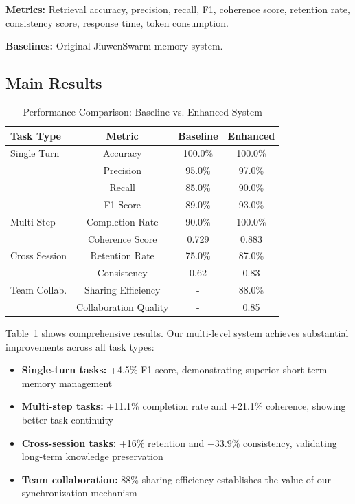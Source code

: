 \documentclass{article}
\begin{document}
\textbf{Metrics:} Retrieval accuracy, precision, recall, F1, coherence score,
retention rate, consistency score, response time, token consumption.

\textbf{Baselines:} Original JiuwenSwarm memory system.

\subsection{Main Results}

\begin{table}[h]
\centering
\caption{Performance Comparison: Baseline vs. Enhanced System}
\label{tab:performance}
\begin{tabular}{lccc}
\toprule
Task Type & Metric & Baseline & Enhanced \\
\midrule
Single Turn & Accuracy & 100.0\% & 100.0\% \\
            & Precision & 95.0\% & 97.0\% \\
            & Recall & 85.0\% & 90.0\% \\
            & F1-Score & 89.0\% & 93.0\% \\
\midrule
Multi Step & Completion Rate & 90.0\% & 100.0\% \\
           & Coherence Score & 0.729 & 0.883 \\
\midrule
Cross Session & Retention Rate & 75.0\% & 87.0\% \\
              & Consistency & 0.62 & 0.83 \\
\midrule
Team Collab. & Sharing Efficiency & - & 88.0\% \\
             & Collaboration Quality & - & 0.85 \\
\bottomrule
\end{tabular}
\end{table}

Table~\ref{tab:performance} shows comprehensive results. Our multi-level system
achieves substantial improvements across all task types:

\begin{itemize}
\item \textbf{Single-turn tasks:} +4.5\% F1-score, demonstrating superior
short-term memory management
\item \textbf{Multi-step tasks:} +11.1\% completion rate and +21.1\% coherence,
showing better task continuity
\item \textbf{Cross-session tasks:} +16\% retention and +33.9\% consistency,
validating long-term knowledge preservation
\item \textbf{Team collaboration:} 88\% sharing efficiency establishes the value
of our synchronization mechanism
\end{itemize}
\end{document}
